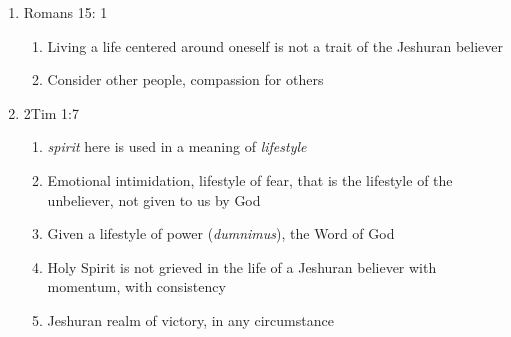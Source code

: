 \documentclass[11pt]{article}
\begin{document}
\begin{enumerate}
\begin{enumerate}
\begin{enumerate}
		\end{enumerate}
		\item Romans 15: 1
		\begin{enumerate}
			\item Living a life centered around oneself is not a trait of the Jeshuran believer
			\item Consider other people, compassion for others
		\end{enumerate}
		\item 2Tim 1:7
		\begin{enumerate}
			\item \emph{spirit} here is used in a meaning of \emph{lifestyle}
			\item Emotional intimidation, lifestyle of fear, that is the lifestyle of the unbeliever, not given to us by God
			\item Given a lifestyle of power (\emph{dumnimus}), the Word of God
			\item Holy Spirit is not grieved in the life of a Jeshuran believer with momentum, with consistency
			\item Jeshuran realm of victory, in any circumstance
		\end{enumerate}
		
	\end{enumerate}
\end{enumerate}
\end{document}
